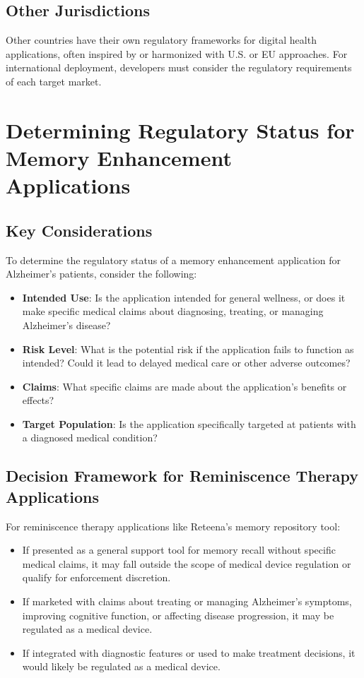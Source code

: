 \subsection{Other Jurisdictions}
Other countries have their own regulatory frameworks for digital health applications, often inspired by or harmonized with U.S. or EU approaches. For international deployment, developers must consider the regulatory requirements of each target market.

\section{Determining Regulatory Status for Memory Enhancement Applications}

\subsection{Key Considerations}
To determine the regulatory status of a memory enhancement application for Alzheimer's patients, consider the following:

\begin{itemize}
    \item \textbf{Intended Use}: Is the application intended for general wellness, or does it make specific medical claims about diagnosing, treating, or managing Alzheimer's disease?
    \item \textbf{Risk Level}: What is the potential risk if the application fails to function as intended? Could it lead to delayed medical care or other adverse outcomes?
    \item \textbf{Claims}: What specific claims are made about the application's benefits or effects?
    \item \textbf{Target Population}: Is the application specifically targeted at patients with a diagnosed medical condition?
\end{itemize}

\subsection{Decision Framework for Reminiscence Therapy Applications}
\begin{tcolorbox}[infobox, title=Regulatory Consideration for Reteena]
For reminiscence therapy applications like Reteena's memory repository tool:
\begin{itemize}
    \item If presented as a general support tool for memory recall without specific medical claims, it may fall outside the scope of medical device regulation or qualify for enforcement discretion.
    \item If marketed with claims about treating or managing Alzheimer's symptoms, improving cognitive function, or affecting disease progression, it may be regulated as a medical device.
    \item If integrated with diagnostic features or used to make treatment decisions, it would likely be regulated as a medical device.
\end{itemize}
\end{tcolorbox}

